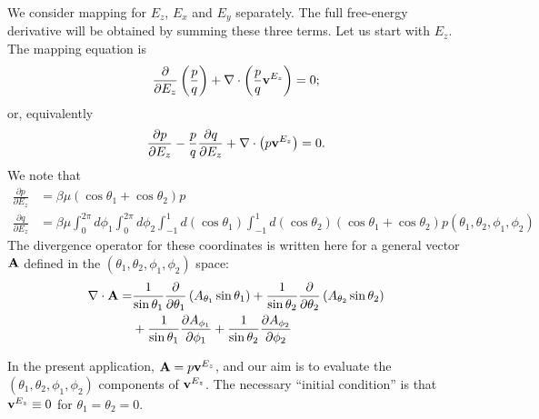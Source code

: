 \documentclass[11pt,reqno]{amsart}
\begin{document}
We consider mapping for $E_z$, $E_x$ and $E_y$ separately.  The full free-energy derivative will be obtained by summing these three terms. Let us start with $E_z$.  The mapping equation is
\begin{equation}
\label{eq:master1}
\frac{\partial }{\partial E_z}\left(\frac{p}{q}\right)+\nabla\cdot\left(\frac{p}{q}{\bf v}^{E_z}\right)=0;
\end{equation}
or, equivalently
\begin{equation}
\label{eq:master2}
\frac{\partial p}{\partial E_z}-\frac{p}{q}\frac{\partial q}{\partial E_z}+\nabla\cdot\left(p{\bf v}^{E_z}\right)=0.
\end{equation}
We note that
\begin{subequations}
\label{eq:pqDerivs}
\begin{align}
\label{eq:pDeriv}
\frac{\partial p}{\partial E_z}&=\beta\mu (\cos\theta_1 + \cos\theta_2)p \\
\label{eq:qDeriv}
\frac{\partial q}{\partial E_z}&=\beta\mu \int_0^{2\pi} d\phi_1\int_0^{2\pi} d\phi_2 \int_{-1}^{1} d(\cos\theta_1) \int_{-1}^{1} d(\cos\theta_2) (\cos\theta_1 + \cos\theta_2)p(\theta_1,\theta_2,\phi_1,\phi_2)
\end{align}
\end{subequations}
The divergence operator for these coordinates is written here for a general vector ${\bf A}$ defined in the $(\theta_1,\theta_2,\phi_1,\phi_2)$ space:
\begin{align}
\label{eq:divergence}
\nabla\cdot {\bf A} =& \frac{1}{\sin\theta_1}\frac{\partial}{\partial \theta_1}\left(A_{\theta_1} \sin\theta_1\right)+\frac{1}{\sin\theta_2}\frac{\partial}{\partial \theta_2}\left(A_{\theta_2} \sin\theta_2\right)\nonumber\\
& + \frac{1}{\sin\theta_1}\frac{\partial A_{\phi_1}}{\partial \phi_1} + \frac{1}{\sin\theta_2}\frac{\partial A_{\phi_2}}{\partial \phi_2}
\end{align}

In the present application, ${\bf A} = p {\bf v}^{E_z}$, and our aim is to evaluate the $(\theta_1,\theta_2,\phi_1,\phi_2)$ components of ${\bf v}^{E_z}$. The necessary ``initial condition'' is that ${\bf v}^{E_z}\equiv 0$ for $\theta_1 = \theta_2 = 0$. 
\end{document}
